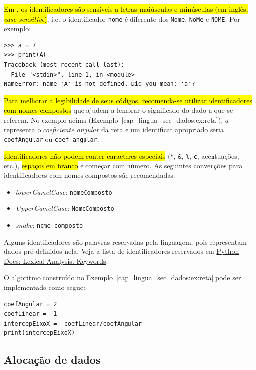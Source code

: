 \hl{Em {\python}, os identificadores são sensíveis a letras maiúsculas e minúsculas (em inglês, \textit{case sensitive})}, i.e. o identificador \lstinline+nome+ é diferente dos \lstinline+Nome+, \lstinline+NoMe+ e \lstinline+NOME+. Por exemplo:
\begin{lstlisting}
>>> a = 7
>>> print(A)
Traceback (most recent call last):
  File "<stdin>", line 1, in <module>
NameError: name 'A' is not defined. Did you mean: 'a'?
\end{lstlisting}

\hl{Para melhorar a legibilidade de seus códigos, recomenda-se utilizar identificadores com nomes compostos} que ajudem a lembrar o significado do dado a que se referem. No exemplo acima (Exemplo~\ref{cap_lingua_sec_dados:ex:reta}), $a$ representa o \emph{coeficiente angular} da reta e um identificar apropriado seria \lstinline+coefAngular+ ou \lstinline+coef_angular+.

\hl{Identificadores não podem conter caracteres especiais} (\lstinline+*+, \lstinline+&+, \lstinline+%+,
\lstinline+ç+, acentuações, etc.), \hl{espaços em branco} e começar com número. As seguintes convenções para identificadores com nomes compostos são recomendadas:
\begin{itemize}
\item \emph{lowerCamelCase}: \lstinline+nomeComposto+
\item \emph{UpperCamelCase}: \lstinline+NomeComposto+
\item \emph{snake}: \lstinline+nome_composto+
\end{itemize}

Alguns identificadores são palavras reservadas pela linguagem, pois representam dados pré-definidos nela. Veja a lista de identificadores reservados em \href{https://docs.python.org/3/reference/lexical_analysis.html#keywords}{Python Docs: Lexical Analysis: Keywords}.

\begin{ex}
  O algoritmo construído no Exemplo~\ref{cap_lingua_sec_dados:ex:reta} pode ser implementado como segue:
\begin{lstlisting}
coefAngular = 2
coefLinear = -1
intercepEixoX = -coefLinear/coefAngular
print(intercepEixoX)
\end{lstlisting}
\end{ex}

\subsection{Alocação de dados}

